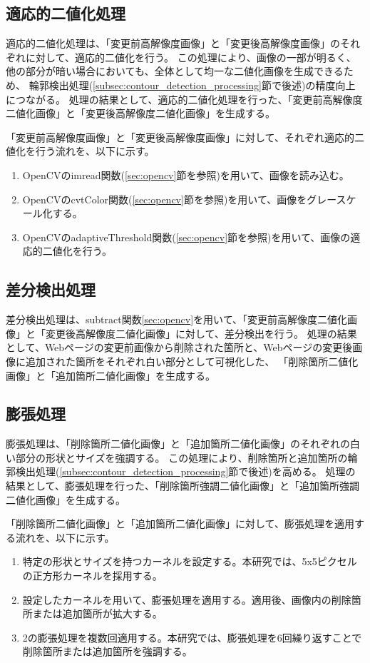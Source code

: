 \subsection{適応的二値化処理}\label{subsec:Adaptive_Binarisation}
適応的二値化処理は、「変更前高解像度画像」と「変更後高解像度画像」のそれぞれに対して、適応的二値化を行う。
この処理により、画像の一部が明るく、他の部分が暗い場合においても、全体として均一な二値化画像を生成できるため、
輪郭検出処理(\ref{subsec:contour_detection_processing}節で後述)の精度向上につながる。
処理の結果として、適応的二値化処理を行った、「変更前高解像度二値化画像」と「変更後高解像度二値化画像」を生成する。
\par
「変更前高解像度画像」と「変更後高解像度画像」に対して、それぞれ適応的二値化を行う流れを、以下に示す。
\begin{enumerate}
    \item OpenCVのimread関数(\ref{sec:opencv}節を参照)を用いて、画像を読み込む。
    \item OpenCVのcvtColor関数(\ref{sec:opencv}節を参照)を用いて、画像をグレースケール化する。
    \item OpenCVのadaptiveThreshold関数(\ref{sec:opencv}節を参照)を用いて、画像の適応的二値化を行う。
\end{enumerate}


\subsection{差分検出処理}\label{subsec:difference_detection_process}
差分検出処理は、subtract関数\ref{sec:opencv}を用いて、「変更前高解像度二値化画像」と「変更後高解像度二値化画像」に対して、差分検出を行う。
処理の結果として、Webページの変更前画像から削除された箇所と、Webページの変更後画像に追加された箇所をそれぞれ白い部分として可視化した、
「削除箇所二値化画像」と「追加箇所二値化画像」を生成する。

\subsection{膨張処理}\label{subsec:dilation}
膨張処理は、「削除箇所二値化画像」と「追加箇所二値化画像」のそれぞれの白い部分の形状とサイズを強調する。
この処理により、削除箇所と追加箇所の輪郭検出処理(\ref{subsec:contour_detection_processing}節で後述)を高める。
処理の結果として、膨張処理を行った、「削除箇所強調二値化画像」と「追加箇所強調二値化画像」を生成する。
\par
「削除箇所二値化画像」と「追加箇所二値化画像」に対して、膨張処理を適用する流れを、以下に示す。
\begin{enumerate}
    \item 特定の形状とサイズを持つカーネルを設定する。本研究では、5x5ピクセルの正方形カーネルを採用する。
    \item 設定したカーネルを用いて、膨張処理を適用する。適用後、画像内の削除箇所または追加箇所が拡大する。
    \item 2の膨張処理を複数回適用する。本研究では、膨張処理を6回繰り返すことで削除箇所または追加箇所を強調する。
\end{enumerate}

